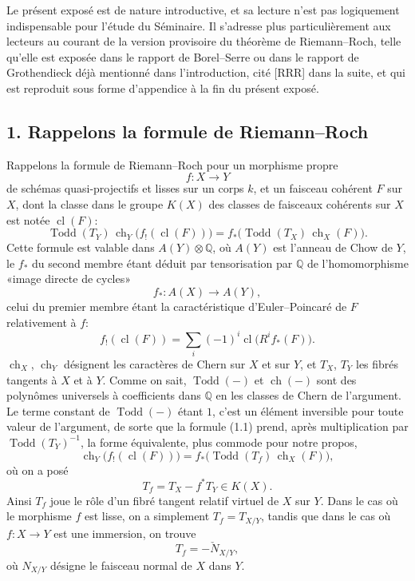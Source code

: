 \documentclass[11pt]{article}
\newcommand{\ch}{\operatorname{ch}}
\newcommand{\Todd}{\operatorname{Todd}}
\newcommand{\cl}{\operatorname{cl}}
\begin{document}
Le présent exposé est de nature introductive, et sa lecture n'est pas logiquement indispensable pour l'étude du Séminaire. Il s'adresse plus particulièrement aux lecteurs au courant de la version provisoire du théorème de Riemann--Roch, telle qu'elle est exposée dans le rapport de Borel--Serre ou dans le rapport de Grothendieck déjà mentionné dans l'introduction, cité [RRR] dans la suite, et qui est reproduit sous forme d'appendice à la fin du présent exposé.

\subsection*{1. Rappelons la formule de Riemann--Roch}
Rappelons la formule de Riemann--Roch pour un morphisme propre
\[
f:X\longrightarrow Y
\]
de schémas quasi-projectifs et lisses sur un corps $k$, et un faisceau cohérent $F$ sur $X$, dont la classe dans le groupe $K(X)$ des classes de faisceaux cohérents sur $X$ est notée $\cl(F)$:
\begin{equation}\tag{1.1}
\Todd(T_Y)\,\ch_Y\bigl(f_!(\cl(F))\bigr)=f_*\bigl(\Todd(T_X)\,\ch_X(F)\bigr).
\end{equation}
Cette formule est valable dans $A(Y)\otimes\mathbb Q$, où $A(Y)$ est l'anneau de Chow de $Y$, le $f_*$ du second membre étant déduit par tensorisation par $\mathbb Q$ de l'homomorphisme «image directe de cycles»
\[
f_*:A(X)\longrightarrow A(Y),
\]
celui du premier membre étant la caractéristique d'Euler--Poincaré de $F$ relativement à $f$:
\[
f_!(\cl(F))=\sum_i(-1)^i\cl\bigl(R^if_*(F)\bigr).
\]
$\ch_X$, $\ch_Y$ désignent les caractères de Chern sur $X$ et sur $Y$, et $T_X$, $T_Y$ les fibrés tangents à $X$ et à $Y$. Comme on sait, $\Todd(-)$ et $\ch(-)$ sont des polynômes universels à coefficients dans $\mathbb Q$ en les classes de Chern de l'argument. Le terme constant de $\Todd(-)$ étant $1$, c'est un élément inversible pour toute valeur de l'argument, de sorte que la formule (1.1) prend, après multiplication par $\Todd(T_Y)^{-1}$, la forme équivalente, plus commode pour notre propos,
\begin{equation}\tag{1.2}
\ch_Y\bigl(f_!(\cl(F))\bigr)=f_*\bigl(\Todd(T_f)\,\ch_X(F)\bigr),
\end{equation}
où on a posé
\begin{equation}\tag{1.3}
T_f=T_X-f^*T_Y\in K(X).
\end{equation}
Ainsi $T_f$ joue le rôle d'un fibré tangent relatif virtuel de $X$ sur $Y$. Dans le cas où le morphisme $f$ est lisse, on a simplement $T_f=T_{X/Y}$, tandis que dans le cas où $f:X\to Y$ est une immersion, on trouve
\[
T_f=-\check N_{X/Y},
\]
où $N_{X/Y}$ désigne le faisceau normal de $X$ dans $Y$.
\end{document}
